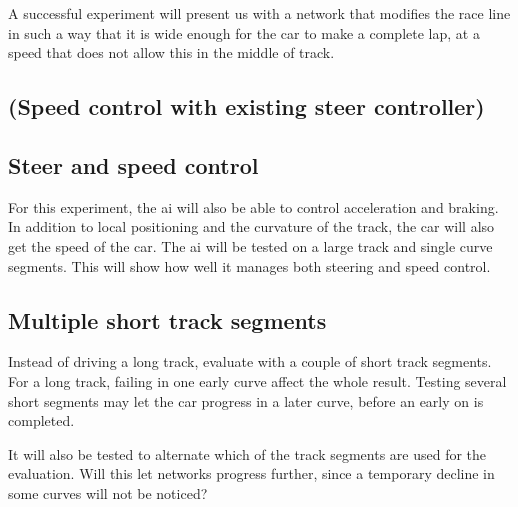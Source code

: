 A successful experiment will present us with a network that modifies the race line in such a way that it is wide enough for the car to make a complete lap, at a speed that does not allow this in the middle of track. 


\subsection{(Speed control with existing steer controller)}

\subsection{Steer and speed control}
For this experiment, the ai will also be able to control acceleration and braking. In addition to local positioning and the curvature of the track, the car will also get the speed of the car.
The ai will be tested on a large track and single curve segments. This will show how well it manages both steering and speed control.

\subsection{Multiple short track segments}
Instead of driving a long track, evaluate with a couple of short track segments. For a long track, failing in one early curve affect the whole result. Testing several short segments may let the car progress in a later curve, before an early on is completed.

It will also be tested to alternate which of the track segments are used for the evaluation. Will this let networks progress further, since a temporary decline in some curves will not be noticed? 
